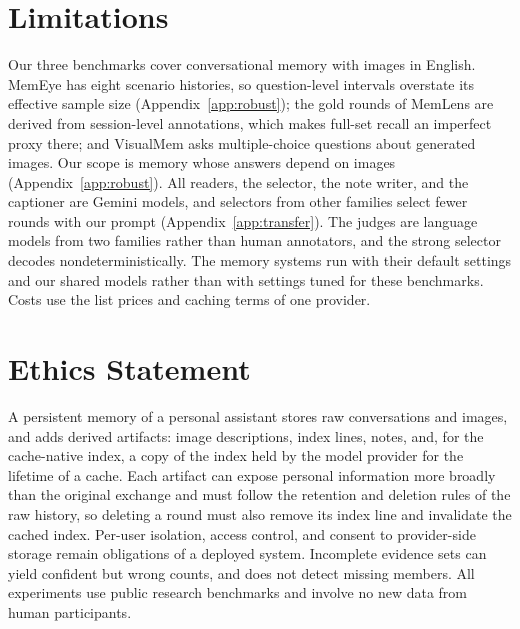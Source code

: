 \section*{Limitations}

Our three benchmarks cover conversational memory with images in English. MemEye has eight scenario histories, so question-level intervals overstate its effective sample size (Appendix~\ref{app:robust}); the gold rounds of MemLens are derived from session-level annotations, which makes full-set recall an imperfect proxy there; and VisualMem asks multiple-choice questions about generated images. Our scope is memory whose answers depend on images (Appendix~\ref{app:robust}). All readers, the selector, the note writer, and the captioner are Gemini models, and selectors from other families select fewer rounds with our prompt (Appendix~\ref{app:transfer}). The judges are language models from two families rather than human annotators, and the strong selector decodes nondeterministically. The memory systems run with their default settings and our shared models rather than with settings tuned for these benchmarks. Costs use the list prices and caching terms of one provider.

\section*{Ethics Statement}

A persistent memory of a personal assistant stores raw conversations and images, and \vgs{} adds derived artifacts: image descriptions, index lines, notes, and, for the cache-native index, a copy of the index held by the model provider for the lifetime of a cache. Each artifact can expose personal information more broadly than the original exchange and must follow the retention and deletion rules of the raw history, so deleting a round must also remove its index line and invalidate the cached index. Per-user isolation, access control, and consent to provider-side storage remain obligations of a deployed system. Incomplete evidence sets can yield confident but wrong counts, and \vgs{} does not detect missing members. All experiments use public research benchmarks and involve no new data from human participants.
